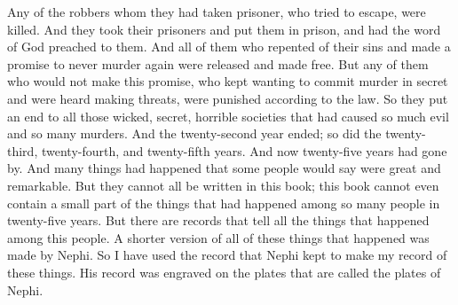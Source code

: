 Any of the robbers whom they had taken prisoner, who tried to escape, were killed. And they took their prisoners and put them in prison, and had the word of God preached to them. And all of them who repented of their sins and made a promise to never murder again were released and made free.
\bverse \iffalse But as many as there were who did not enter into a covenant, and who did still continue to have those secret murders in their hearts, yea, as many as were found breathing out threatenings against their brethren were condemned and punished according to the law. \fi
But any of them who would not make this promise, who kept wanting to commit murder in secret and were heard making threats, were punished according to the law.
\bverse \iffalse And thus they did put an end to all those wicked, and secret, and abominable combinations, in the which there was so much wickedness, and so many murders committed. \fi
So they put an end to all those wicked, secret, horrible societies that had caused so much evil and so many murders.
\bverse \iffalse And thus had the twenty and second year passed away, and the twenty and third year also, and the twenty and fourth, and the twenty and fifth; and thus had twenty and five years passed away. \fi
And the twenty-second year ended; so did the twenty-third, twenty-fourth, and twenty-fifth years. And now twenty-five years had gone by.
\bverse \iffalse And there had many things transpired which, in the eyes of some, would be great and marvelous; nevertheless, they cannot all be written in this book; yea, this book cannot contain even a hundredth part of what was done among so many people in the space of twenty and five years; \fi
And many things had happened that some people would say were great and remarkable. But they cannot all be written in this book; this book cannot even contain a small part of the things that had happened among so many people in twenty-five years.
\bverse \iffalse But behold there are records which do contain all the proceedings of this people; and a shorter but true account was given by Nephi. \fi
But there are records that tell all the things that happened among this people. A shorter version of all of these things that happened was made by Nephi.
\bverse \iffalse Therefore I have made my record of these things according to the record of Nephi, which was engraven on the plates which were called the plates of Nephi. \fi
So I have used the record that Nephi kept to make my record of these things. His record was engraved on the plates that are called the plates of Nephi.
